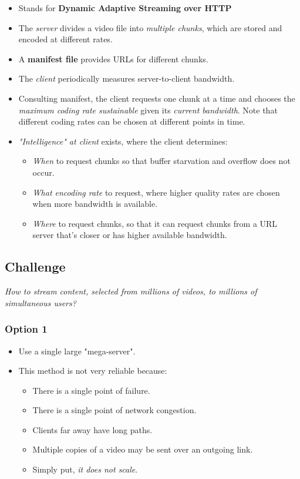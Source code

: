 \documentclass{article}
\begin{document}
\begin{itemize}
\item Stands for {\bf Dynamic Adaptive Streaming over HTTP}
\item The \emph{server} divides a video file into \emph{multiple chunks}, which are stored and encoded at different rates.
\item A {\bf manifest file} provides URLs for different chunks.
\item The \emph{client} periodically measures server-to-client bandwidth.
\item Consulting manifest, the client requests one chunk at a time and chooses the \emph{maximum coding rate sustainable} given its \emph{current bandwidth}. Note that different coding rates can be chosen at different points in time.
\item \emph{"Intelligence" at client} exists, where the client determines:
\begin{itemize}
\item \emph{When} to request chunks so that buffer starvation and overflow does not occur.
\item \emph{What encoding rate} to request, where higher quality rates are chosen when more bandwidth is available.
\item \emph{Where} to request chunks, so that it can request chunks from a URL server that's closer or has higher available bandwidth.
\end{itemize}
\end{itemize}

\subsection{Challenge}
\vspace{-3mm}
\emph{How to stream content, selected from millions of videos, to millions of simultaneous users?}

\subsubsection{Option 1}
\begin{itemize}
\item Use a single large "mega-server".
\item This method is not very reliable because:
\begin{itemize}
\item There is a single point of failure.
\item There is a single point of network congestion.
\item Clients far away have long paths.
\item Multiple copies of a video may be sent over an outgoing link.
\item Simply put, \emph{it does not scale}.
\end{itemize}
\end{itemize}
\end{document}
